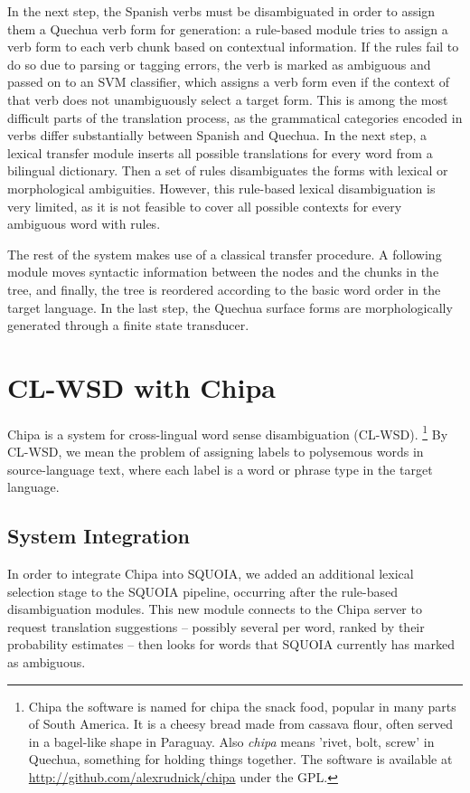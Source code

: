 In the next step, the Spanish verbs must be disambiguated in order to assign
them a Quechua verb form for generation: a rule-based module tries to assign a
verb form to each verb chunk based on contextual information. If the rules fail to
do so due to parsing or tagging errors, the verb is marked as ambiguous and
passed on to an SVM classifier, which assigns a verb form even if the context
of that verb does not unambiguously select a target form. This is among the
most difficult parts of the
translation process, as the grammatical categories encoded in verbs differ
substantially between Spanish and Quechua. In the next step, a lexical transfer
module inserts all possible translations for every word from a bilingual dictionary.
Then a set of rules disambiguates the forms with lexical or morphological
ambiguities. However, this rule-based lexical disambiguation is very limited,
as it is not feasible to cover all possible contexts for every ambiguous word
with rules.

The rest of the system makes use of a classical transfer procedure. A following module
moves syntactic information between the nodes and the chunks in the tree, and
finally, the tree is reordered according to the basic word order in the target
language. In the last step, the Quechua surface forms are morphologically
generated through a finite state transducer.

\section{CL-WSD with Chipa}
Chipa is a system for cross-lingual word sense disambiguation (CL-WSD).
\footnote{Chipa the software is named for chipa the snack food, popular in many
  parts of South America. It is a cheesy bread made from cassava flour, often
  served in a bagel-like shape in Paraguay.  Also \emph{chipa} means 'rivet,
  bolt, screw' in Quechua, something for holding things together.  The software
is available at \\ \url{http://github.com/alexrudnick/chipa} under the GPL.} By
CL-WSD, we mean the problem of assigning labels to polysemous words in
source-language text, where each label is a word or phrase type in the target
language.


\subsection{System Integration}
In order to integrate Chipa into SQUOIA, we added an additional lexical
selection stage to the SQUOIA pipeline, occurring after the rule-based
disambiguation modules. This new module connects to the Chipa server to request
translation suggestions -- possibly several per word, ranked by their
probability estimates -- then looks for words that SQUOIA currently has marked
as ambiguous.


